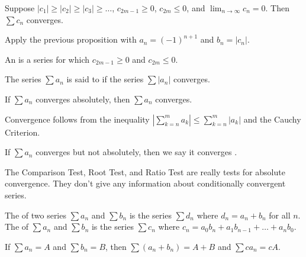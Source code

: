 \documentclass{mathnotes}
\begin{document}
\begin{prop}
  Suppose $|c_1|\ge|c_2|\ge|c_3|\ge\ldots$, $c_{2m-1}\ge0$, $c_{2m}\le0$, and
  $\lim_{n\to\infty}c_n=0$. Then $\sum c_n$ converges.
\end{prop}

\begin{pf}
  Apply the previous proposition with $a_n=(-1)^{n+1}$ and $b_n=|c_n|$.
\end{pf}

\begin{defi}
  An  is a series for which $c_{2m-1}\ge0$ and
  $c_{2m}\le0$.
\end{defi}

\begin{defi}
  The series $\sum a_n$ is said to  if the series
  $\sum|a_n|$ converges.
\end{defi}

\begin{prop}
  If $\sum a_n$ converges absolutely, then $\sum a_n$ converges.
\end{prop}

\begin{pf}
  Convergence follows from the inequality
  $|\sum_{k=n}^ma_k|\le\sum_{k=n}^m|a_k|$ and the Cauchy Criterion.
\end{pf}

\begin{defi}
  If $\sum a_n$ converges but not absolutely, then we say it converges
  .
\end{defi}

\begin{note}
  The Comparison Test, Root Test, and Ratio Test are really tests for absolute
  convergence. They don't give any information about conditionally convergent
  series.
\end{note}

\begin{defi}
  The  of two series $\sum a_n$ and $\sum b_n$ is the series $\sum
  d_n$ where $d_n=a_n+b_n$ for all $n$. The  of $\sum a_n$ and
  $\sum b_n$ is the series $\sum c_n$ where
  $c_n=a_0b_n+a_1b_{n-1}+\ldots+a_nb_0$.
\end{defi}

\begin{prop}
  If $\sum a_n=A$ and $\sum b_n=B$, then $\sum(a_n+b_n)=A+B$ and $\sum
  ca_n=cA$.
\end{prop}
\end{document}

